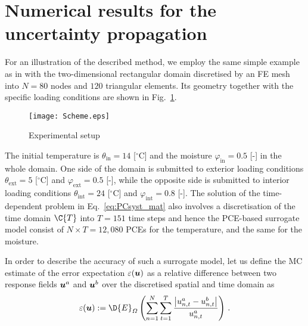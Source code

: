 \documentclass[preprint,12pt]{elsarticle}
\newcommand{\vek}[1]{\mathchoice{\displaystyle\boldsymbol#1}
{\textstyle\boldsymbol#1}{\scriptstyle\boldsymbol#1}
{\scriptscriptstyle\boldsymbol#1}}
\begin{document}
\section{Numerical results for the uncertainty propagation}
\label{sec:res_prop}
For an illustration of the described method, we employ the same simple
example as in \cite{Kucerova:2011:AMC} with the two-dimensional
rectangular domain discretised by an FE mesh into $N = 80$ nodes and
$120$ triangular elements. Its geometry together with the specific
loading conditions are shown in Fig.~\ref{fig_scheme}.
\begin{figure}[h!]
\centering
\texttt{[image: Scheme.eps]}
\caption{Experimental setup} \label{fig_scheme}
\end{figure}
The initial temperature is $\theta_{\mathrm{in}} = 14$
[$^{\circ}$C] and the moisture $\varphi_{\mathrm{in}} = 0.5$ [-]
in the whole domain. One side of the domain is submitted to
exterior loading conditions $\theta_{\mathrm{ext}} = 5$
[$^{\circ}$C] and $\varphi_{\mathrm{ext}} = 0.5$ [-], while the
opposite side is submitted to interior loading conditions
$\theta_{\mathrm{int}} = 24$ [$^{\circ}$C] and
$\varphi_{\mathrm{int}} = 0.8$ [-]. The solution of the
time-dependent problem in Eq.~\eqref{eq:PCsyst_mat} also involves
a discretisation of the time domain $\C{T}$ into $T = 151$ time
steps and hence the PCE-based surrogate model consist of $N \times
T = 12,080$ PCEs for the temperature, and the same for the
moisture.

In order to describe the accuracy of such a surrogate model, let
us define the MC estimate of the error expectation
$\varepsilon(\vek{u})$ as a relative difference between two
response fields $\vek{u}^a$ and $\vek{u}^b$ over the discretised
spatial and time domain as
\begin{equation}
  \varepsilon (\vek{u}) := \D{E}_{\mit{\Omega}}
  \left( \sum_{n=1}^N \sum_{t=1}^T
  \frac{\left|u^a_{n,t} - u^b_{n,t}\right|}{u^a_{n,t}} \right) \, .
\end{equation}
\end{document}
